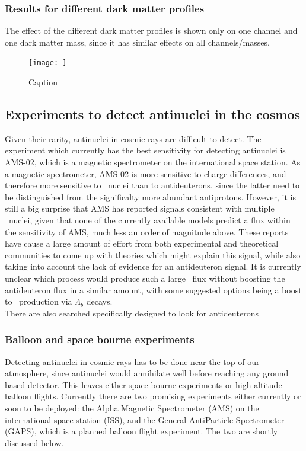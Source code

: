 \subsubsection{Results for different dark matter profiles}\label{sec:ResDMProfiles}
The effect of the different dark matter profiles is shown only on one channel and one dark matter mass, since it has similar effects on all channels/masses. 

\begin{figure}
    \centering
    \texttt{[image: ]}
    \caption{Caption}
    \label{fig:my_label}
\end{figure}
\subsection{Experiments to detect antinuclei in the cosmos}
Given their rarity, antinuclei in cosmic rays are difficult to detect. The experiment which currently has the best sensitivity for detecting antinuclei is AMS-02, which is a magnetic spectrometer on the international space station. As a magnetic spectrometer, AMS-02 is more sensitive to charge differences, and therefore more sensitive to \ahe\ nuclei than to antideuterons, since the latter need to be distinguished from the significalty more abundant antiprotons. However, it is still a big surprise that AMS has reported signals consistent with multiple \ahe\ nuclei, given that none of the currently available models predict a flux within the sensitivity of AMS, much less an order of magnitude above. These reports have cause a large amount of effort from both experimental and theoretical communities to come up with theories which might explain this signal, while also taking into account the lack of evidence for an antideuteron signal. It is currently unclear which process would produce such a large \ahe\ flux without boosting the antideuteron flux in a similar amount, with some suggested options being a boost to \ahe\ production via $\Lambda_b$ decays\cite{}. \\

There are also searched specifically designed to look for antideuterons
\subsubsection{Balloon and space bourne experiments}
Detecting antinuclei in cosmic rays has to be done near the top of our atmosphere, since antinuclei would annihilate well before reaching any ground based detector. This leaves either space bourne experiments or high altitude balloon flights. Currently there are two promising experiments either currently or soon to be deployed: the Alpha Magnetic Spectrometer (AMS) on the international space station (ISS), and the General AntiParticle Spectrometer (GAPS), which is a planned balloon flight experiment. The two are shortly discussed below.\\

